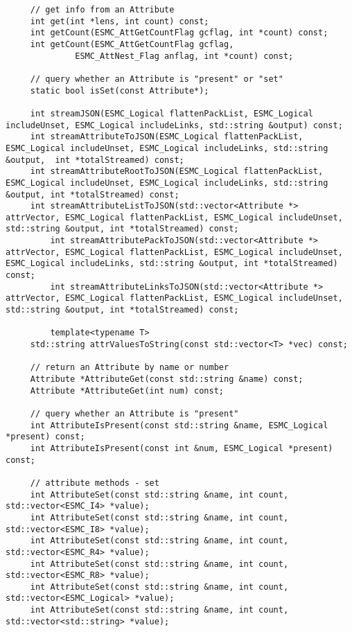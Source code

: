 \begin{verbatim}
     // get info from an Attribute
     int get(int *lens, int count) const;
     int getCount(ESMC_AttGetCountFlag gcflag, int *count) const;
     int getCount(ESMC_AttGetCountFlag gcflag,
              ESMC_AttNest_Flag anflag, int *count) const;
 
     // query whether an Attribute is "present" or "set"
     static bool isSet(const Attribute*);
 
     int streamJSON(ESMC_Logical flattenPackList, ESMC_Logical includeUnset, ESMC_Logical includeLinks, std::string &output) const;
     int streamAttributeToJSON(ESMC_Logical flattenPackList, ESMC_Logical includeUnset, ESMC_Logical includeLinks, std::string &output,  int *totalStreamed) const;
     int streamAttributeRootToJSON(ESMC_Logical flattenPackList, ESMC_Logical includeUnset, ESMC_Logical includeLinks, std::string &output, int *totalStreamed) const;
     int streamAttributeListToJSON(std::vector<Attribute *> attrVector, ESMC_Logical flattenPackList, ESMC_Logical includeUnset, std::string &output, int *totalStreamed) const;
         int streamAttributePackToJSON(std::vector<Attribute *> attrVector, ESMC_Logical flattenPackList, ESMC_Logical includeUnset, ESMC_Logical includeLinks, std::string &output, int *totalStreamed) const;
         int streamAttributeLinksToJSON(std::vector<Attribute *> attrVector, ESMC_Logical flattenPackList, ESMC_Logical includeUnset, std::string &output, int *totalStreamed) const;
 
         template<typename T>
     std::string attrValuesToString(const std::vector<T> *vec) const;
 
     // return an Attribute by name or number
     Attribute *AttributeGet(const std::string &name) const;
     Attribute *AttributeGet(int num) const;
 
     // query whether an Attribute is "present"
     int AttributeIsPresent(const std::string &name, ESMC_Logical *present) const;
     int AttributeIsPresent(const int &num, ESMC_Logical *present) const;
 
     // attribute methods - set
     int AttributeSet(const std::string &name, int count, std::vector<ESMC_I4> *value);
     int AttributeSet(const std::string &name, int count, std::vector<ESMC_I8> *value);
     int AttributeSet(const std::string &name, int count, std::vector<ESMC_R4> *value);
     int AttributeSet(const std::string &name, int count, std::vector<ESMC_R8> *value);
     int AttributeSet(const std::string &name, int count, std::vector<ESMC_Logical> *value);
     int AttributeSet(const std::string &name, int count, std::vector<std::string> *value);
 

\end{verbatim}

